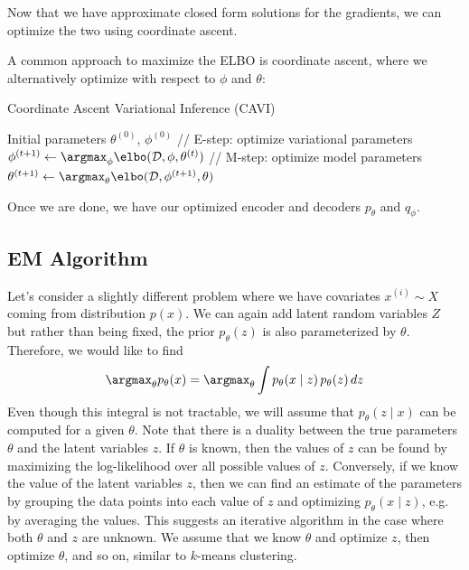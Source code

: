   Now that we have approximate closed form solutions for the gradients, we can optimize the two using coordinate ascent. 

  \begin{algo}
    A common approach to maximize the ELBO is coordinate ascent, where we alternatively optimize with respect to $\phi$ and $\theta$:

    \begin{algorithm}[H]
      \caption{Coordinate Ascent Variational Inference (CAVI)}
      \begin{algorithmic}[1]
        \Require Initial parameters $\theta^{(0)}$, $\phi^{(0)}$
          \State // E-step: optimize variational parameters
          \State $\phi^{(t+1)} \gets \argmax_\phi \elbo(\mathcal{D}, \phi, \theta^{(t)})$
          \State // M-step: optimize model parameters
          \State $\theta^{(t+1)} \gets \argmax_\theta \elbo(\mathcal{D}, \phi^{(t+1)}, \theta)$
        \EndWhile
      \end{algorithmic}
    \end{algorithm}
  \end{algo} 

  Once we are done, we have our optimized encoder and decoders $p_\theta$ and $q_\phi$. 
  
\subsection{EM Algorithm} 

  Let's consider a slightly different problem where we have covariates $x^{(i)} \sim X$ coming from distribution $p(x)$. We can again add latent random variables $Z$ but rather than being fixed, the prior $p_\theta (z)$ is also parameterized by $\theta$. Therefore, we would like to find 
  \begin{equation}
    \argmax_\theta p_\theta (x) = \argmax_\theta \int p_\theta (x \mid z) \, p_\theta (z) \,dz
  \end{equation} 
  Even though this integral is not tractable, we will assume that $p_\theta (z \mid x)$ can be computed for a given $\theta$. Note that there is a duality between the true parameters $\theta$ and the latent variables $z$. If $\theta$ is known, then the values of $z$ can be found by maximizing the log-likelihood over all possible values of $z$. Conversely, if we know the value of the latent variables $z$, then we can find an estimate of the parameters by grouping the data points into each value of $z$ and optimizing $p_\theta (x \mid z)$, e.g. by averaging the values. This suggests an iterative algorithm in the case where both $\theta$ and $z$ are unknown. We assume that we know $\theta$ and optimize $z$, then optimize $\theta$, and so on, similar to $k$-means clustering. 

